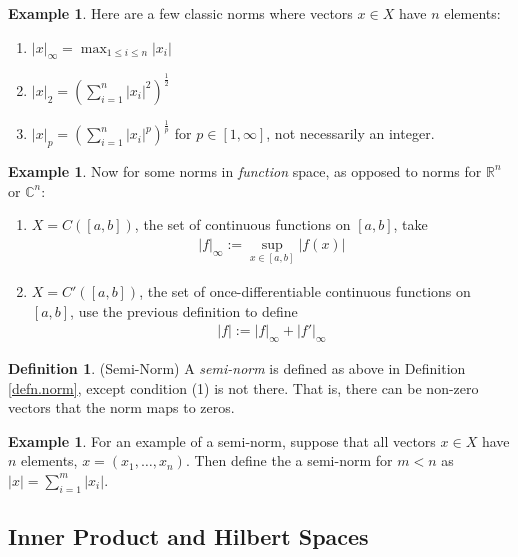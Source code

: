 \documentclass[12pt]{article}
\theoremstyle{plain}
\theoremstyle{definition}
\newtheorem{defn}[thm]{Definition}
\newtheorem{ex}[thm]{Example}
\theoremstyle{remark}
\begin{document}
\begin{ex}
Here are a few classic norms where vectors $x\in X$ have $n$ elements:
\begin{enumerate}
\item $\lvert x\rvert_\infty = \max_{1\leq i\leq n} |x_i|$
\item $\lvert x\rvert_2 = \left(\sum_{i=1}^n |x_i|^2\right)^{\frac{1}{2}}$
\item $\lvert x\rvert_p = \left(\sum_{i=1}^n
  |x_i|^p\right)^{\frac{1}{p}}$ for $p\in[1,\infty]$, not necessarily an
  integer.
\end{enumerate}
\end{ex}

\begin{ex}
Now for some norms in \emph{function} space, as opposed to norms for
$\mathbb{R}^n$ or $\mathbb{C}^n$:
\begin{enumerate}
\item $X=C([a,b])$, the set of continuous functions on $[a,b]$, take
  \begin{align*}
    \lvert f\rvert_\infty :=
    \sup_{x\in[a,b]} |f(x)|
  \end{align*}
\item $X=C'([a,b])$, the set of once-differentiable continuous functions
  on $[a,b]$, use the previous definition to define
  \begin{align*}
    \lvert f\rvert := \lvert f\rvert_\infty + \lvert f'\rvert_\infty
  \end{align*}
\end{enumerate}
\end{ex}

\begin{defn}(Semi-Norm)
A \emph{semi-norm} is defined as above in Definition \ref{defn.norm},
except condition (1) is not there. That is, there can be non-zero
vectors that the norm maps to zeros.
\end{defn}
\begin{ex}
For an example of a semi-norm, suppose that all vectors $x\in X$ have
$n$ elements, $x=(x_1,\ldots,x_n)$. Then define the a semi-norm for
$m<n$ as $\lvert x\rvert = \sum_{i=1}^m |x_i|$.
\end{ex}

\subsection{Inner Product and Hilbert Spaces}
\end{document}
